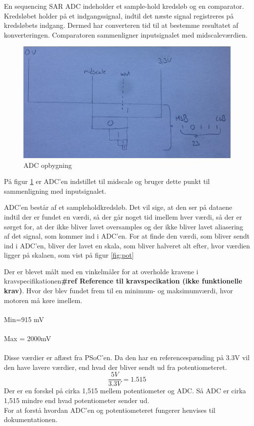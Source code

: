 En sequencing SAR ADC indeholder et sample-hold kredsløb og en comparator. Kredsløbet holder på et indgangssignal, indtil det næste signal registreres på kredsløbets indgang. Dermed har converteren tid til at bestemme resultatet af konverteringen. Comparatoren sammenligner inputsignalet med midscaleværdien. 

\begin{figure}[H]
	\centering
	\includegraphics[width=\textwidth]{Afsnit/DesignOgImplementering/images/ADC}
	\caption{ADC opbygning}
	\label{fig:konvertering}
\end{figure}

På figur \ref{fig:konvertering} er ADC'en indstillet til midscale og bruger dette punkt til sammenligning med inputsignalet.  

ADC’en består af et sampleholdkredsløb. Det vil sige, at den ser på dataene indtil der er fundet en værdi, så der går noget tid imellem hver værdi, så der er sørget for, at der ikke bliver lavet oversamples og der ikke bliver lavet aliasering af det signal, som kommer ind i ADC’en. For at finde den værdi, som bliver sendt ind i ADC'en, bliver der lavet en skala, som bliver halveret alt efter, hvor værdien ligger på skalaen, som vist på figur \ref{fig:pot}

Der er blevet målt med en vinkelmåler for at overholde kravene i kravspecifikationen\textbf{\#ref Reference til kravspecikation (ikke funktionelle krav)}. Hvor der blev fundet frem til en minimum- og maksimumværdi, hvor motoren må køre imellem. \\
\\
Min=915 mV\\
\\
Max = 2000mV\\
\\
Disse værdier er aflæst fra PSoC’en. Da den har en referencespænding på 3.3V vil den have lavere værdier, end hvad der bliver sendt ud fra potentiometeret.
\begin{equation}
 \frac {5V} {3.3V}= 1.515
\end{equation}
Der er en forskel på cirka 1,515 mellem potentiometer og ADC. Så ADC er cirka 1,515 mindre end hvad potentiometer sender ud.
\\
For at forstå hvordan ADC’en og potentiometeret fungerer henvises til dokumentationen.



